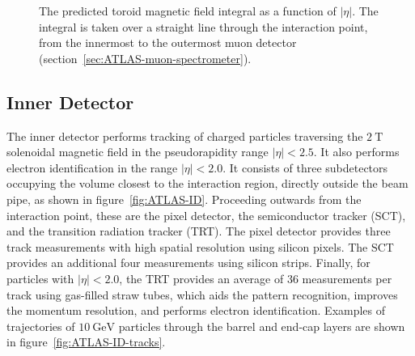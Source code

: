 \begin{figure}[htbp]
	\centering
	\caption{The predicted toroid magnetic field integral as a function of $|\eta|$. The integral is taken over a straight line through the interaction point, from the innermost to the outermost muon detector (section~\ref{sec:ATLAS-muon-spectrometer}).}
	\label{fig:ATLAS-toroid-Bintegral}
\end{figure}



\subsection{Inner Detector}\label{sec:ATLAS-inner-detector}

The inner detector performs tracking of charged particles traversing the $\SI{2}{\tesla}$ solenoidal magnetic field in the pseudorapidity range $|\eta|<2.5$. It also performs electron identification in the range $|\eta|<2.0$. It consists of three subdetectors occupying the volume closest to the interaction region, directly outside the beam pipe, as shown in figure~\ref{fig:ATLAS-ID}. Proceeding outwards from the interaction point, these are the pixel detector, the semiconductor tracker (SCT), and the transition radiation tracker (TRT). The pixel detector provides three track measurements with high spatial resolution using silicon pixels. The SCT provides an additional four measurements using silicon strips. Finally, for particles with $|\eta|<2.0$, the TRT provides an average of 36 measurements per track using gas-filled straw tubes, which aids the pattern recognition, improves the momentum resolution, and performs electron identification. Examples of trajectories of $\SI{10}{\giga\electronvolt}$ particles through the barrel and end-cap layers are shown in figure~\ref{fig:ATLAS-ID-tracks}.

